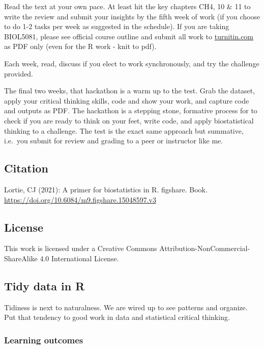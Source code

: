 \documentclass[
]{book}
\begin{document}
Read the text at your own pace. At least hit the key chapters CH4, 10 \& 11 to write the review and submit your insights by the fifth week of work (if you choose to do 1-2 tasks per week as suggested in the schedule). If you are taking BIOL5081, please see official course outline and submit all work to \href{https://www.turnitin.com}{turnitin.com} as PDF only (even for the R work - knit to pdf).

Each week, read, discuss if you elect to work synchronously, and try the challenge provided.

The final two weeks, that hackathon is a warm up to the test. Grab the dataset, apply your critical thinking skills, code and show your work, and capture code and outputs as PDF. The hackathon is a stepping stone, formative process for to check if you are ready to think on your feet, write code, and apply biostatistical thinking to a challenge. The test is the exact same approach but summative, i.e.~you submit for review and grading to a peer or instructor like me.

\hypertarget{citation}{%
\subsection*{Citation}\label{citation}}

Lortie, CJ (2021): A primer for biostatistics in R. figshare. Book. \url{https://doi.org/10.6084/m9.figshare.15048597.v3}

\hypertarget{license}{%
\subsection*{License}\label{license}}

This work is licensed under a Creative Commons Attribution-NonCommercial-ShareAlike 4.0 International License.

\hypertarget{tidy-data-in-r}{%
\subsection*{Tidy data in R}\label{tidy-data-in-r}}

Tidiness is next to naturalness. We are wired up to see patterns and organize. Put that tendency to good work in data and statistical critical thinking.

\hypertarget{learning-outcomes-1}{%
\subsubsection*{Learning outcomes}\label{learning-outcomes-1}}
\end{document}
